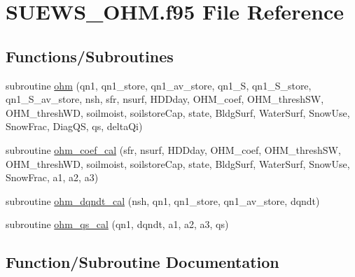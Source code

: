 \hypertarget{_s_u_e_w_s___o_h_m_8f95}{}\section{S\+U\+E\+W\+S\+\_\+\+O\+H\+M.\+f95 File Reference}
\label{_s_u_e_w_s___o_h_m_8f95}
\subsection*{Functions/\+Subroutines}
\begin{DoxyCompactItemize}
\item 
subroutine \hyperlink{_s_u_e_w_s___o_h_m_8f95_ab185f57c5ea6cf2099e1287a56748702}{ohm} (qn1, qn1\+\_\+store, qn1\+\_\+av\+\_\+store, qn1\+\_\+S, qn1\+\_\+\+S\+\_\+store, qn1\+\_\+\+S\+\_\+av\+\_\+store, nsh, sfr, nsurf, H\+D\+Dday, O\+H\+M\+\_\+coef, O\+H\+M\+\_\+thresh\+SW, O\+H\+M\+\_\+thresh\+WD, soilmoist, soilstore\+Cap, state, Bldg\+Surf, Water\+Surf, Snow\+Use, Snow\+Frac, Diag\+QS, qs, delta\+Qi)
\item 
subroutine \hyperlink{_s_u_e_w_s___o_h_m_8f95_afb34d8d06c1f1fcb2543f89f53185ffd}{ohm\+\_\+coef\+\_\+cal} (sfr, nsurf, H\+D\+Dday, O\+H\+M\+\_\+coef, O\+H\+M\+\_\+thresh\+SW, O\+H\+M\+\_\+thresh\+WD, soilmoist, soilstore\+Cap, state, Bldg\+Surf, Water\+Surf, Snow\+Use, Snow\+Frac, a1, a2, a3)
\item 
subroutine \hyperlink{_s_u_e_w_s___o_h_m_8f95_aab92e372bc8d7a7394e70e0c6e7a1f21}{ohm\+\_\+dqndt\+\_\+cal} (nsh, qn1, qn1\+\_\+store, qn1\+\_\+av\+\_\+store, dqndt)
\item 
subroutine \hyperlink{_s_u_e_w_s___o_h_m_8f95_a02a2622429b5a1d1ccc282269bc2aa0d}{ohm\+\_\+qs\+\_\+cal} (qn1, dqndt, a1, a2, a3, qs)
\end{DoxyCompactItemize}


\subsection{Function/\+Subroutine Documentation}
\mbox{\label{_s_u_e_w_s___o_h_m_8f95_ab185f57c5ea6cf2099e1287a56748702}} 

